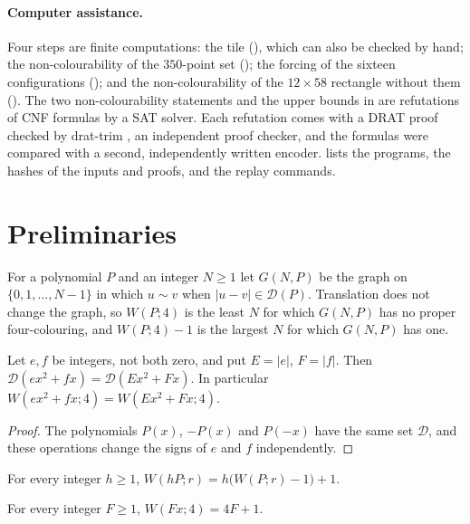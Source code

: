 \documentclass[11pt,colorlinks]{charlie}
\newcommand{\D}{\mathcal D}
\begin{document}
\paragraph{Computer assistance.}
Four steps are finite computations: the tile (), which can also be checked by hand; the non-colourability of the $350$-point set (); the forcing of the sixteen configurations (); and the non-colourability of the $12\times58$ rectangle without them (). The two non-colourability statements and the upper bounds in  are refutations of CNF formulas by a SAT solver. Each refutation comes with a DRAT proof checked by drat-trim \cite{DRAT}, an independent proof checker, and the formulas were compared with a second, independently written encoder.  lists the programs, the hashes of the inputs and proofs, and the replay commands.

\section{Preliminaries}\label{sec:prelim}

For a polynomial $P$ and an integer $N\ge1$ let $G(N,P)$ be the graph on $\{0,1,\dots,N-1\}$ in which $u\sim v$ when $|u-v|\in\D(P)$. Translation does not change the graph, so $W(P;4)$ is the least $N$ for which $G(N,P)$ has no proper four-colouring, and $W(P;4)-1$ is the largest $N$ for which $G(N,P)$ has one.

\begin{lemma}\label{lem:symmetry}
Let $e,f$ be integers, not both zero, and put $E=|e|$, $F=|f|$. Then $\D(ex^2+fx)=\D(Ex^2+Fx)$. In particular $W(ex^2+fx;4)=W(Ex^2+Fx;4)$.
\end{lemma}

\begin{proof}
The polynomials $P(x)$, $-P(x)$ and $P(-x)$ have the same set $\D$, and these operations change the signs of $e$ and $f$ independently.
\end{proof}

\begin{lemma}\label{lem:scaling}
For every integer $h\ge1$, $W(hP;r)=h\bigl(W(P;r)-1\bigr)+1$.
\end{lemma}

\begin{lemma}\label{lem:linear}
For every integer $F\ge1$, $W(Fx;4)=4F+1$.
\end{lemma}
\end{document}
